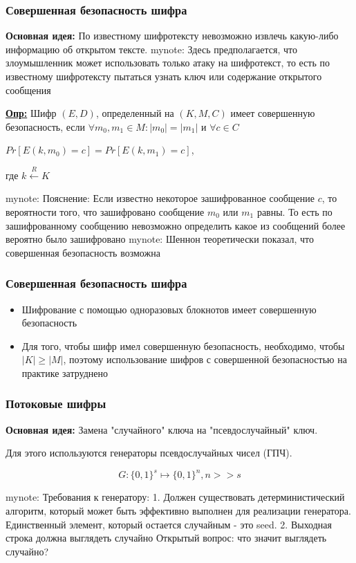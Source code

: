 \documentclass{beamer}
\newcommand{\longdef}[1]{{\textbf{\underline{Опр:}} #1}}
\newcommand{\set}[1]{{\lbrace #1 \rbrace}}
\newcommand{\mynote}[1]{mynote: #1}
\newcommand{\mynote}[1]{}
\begin{document}
\begin{frame}
  \frametitle{Совершенная безопасность шифра}

  \textbf{Основная идея:} По известному шифротексту невозможно извлечь какую-либо информацию об открытом тексте.
  \mynote{Здесь предполагается, что злоумышленник может использовать только атаку
  на шифротекст, то есть по известному шифротексту пытаться узнать ключ или
  содержание открытого сообщения}
  \vspace{2em}

  \longdef{Шифр $(E,D)$, определенный на $(K,M,C)$ имеет совершенную безопасность, если \newline
    $\forall m_{0},m_{1} \in M:  |m_{0}| = |m_{1}|$ и $\forall c \in C$
      \begin{center} $Pr[E(k,m_{0}) = c] = Pr[E(k,m_{1}) = c]$, \end{center}
      где $k \stackrel{R}{\longleftarrow}K$}

  \mynote{Пояснение: Если известно некоторое зашифрованное сообщение $c$, то
    вероятности того, что зашифровано сообщение $m_{0}$ или $m_{1}$ равны. То
    есть по зашифрованному сообщению невозможно определить какое из сообщений
    более вероятно было зашифровано}
  \mynote{Шеннон теоретически показал, что совершенная безопасность возможна}

\end{frame}


\begin{frame}
  \frametitle{Совершенная безопасность шифра}

  \begin{itemize}
    \item{Шифрование с помощью одноразовых блокнотов имеет совершенную безопасность}
    \item{Для того, чтобы шифр имел совершенную безопасность, необходимо, чтобы $|K| \ge |M|$, поэтому использование
          шифров с совершенной безопасностью на практике затруднено}
  \end{itemize}
\end{frame}


\begin{frame}
  \frametitle{Потоковые шифры}

  \textbf{Основная идея:} Замена "случайного" ключа на "псевдослучайный" ключ.
  \vspace{1em}

  Для этого используются генераторы псевдослучайных чисел (ГПЧ).
  \vspace{1em}

  \[G:\set{0,1}^{s} \mapsto \set{0,1}^{n}, n>>s\]

  \mynote{Требования к генератору: 
    1. Должен существовать детерминистический алгоритм, который может быть эффективно выполнен для реализации генератора.
       Единственный элемент, который остается случайным - это seed.
    2. Выходная строка должна выглядеть случайно
    Открытый вопрос: что значит выглядеть случайно?
  }

\end{frame}
\end{document}
